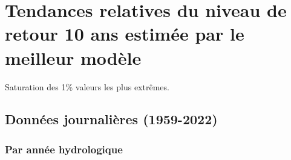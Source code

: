 \documentclass[
  letterpaper,
  DIV=11,
  numbers=noendperiod]{scrartcl}
\begin{document}
\section{Tendances relatives du niveau de retour 10 ans estimée par le
meilleur
modèle}\label{tendances-relatives-du-niveau-de-retour-10-ans-estimuxe9e-par-le-meilleur-moduxe8le}

Saturation des 1\% valeurs les plus extrêmes.

\subsection{Données journalières
(1959-2022)}\label{donnuxe9es-journaliuxe8res-1959-2022-2}

\subsubsection{Par année
hydrologique}\label{par-annuxe9e-hydrologique-2}
\end{document}
